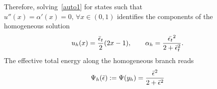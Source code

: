 Therefore, solving~\eqref{auto1} for states such that $u''(x)=\alpha'(x)= 0, \, \forall x\in (0, 1)$ identifies the components of the homogeneous solution
\begin{equation}
u_h(x) =  \frac{\bar \epsilon_t}{2}(2x-1),\qquad\alpha_h = \frac{\Bar{\epsilon_t}^2}{2 + \Bar\epsilon_t^2}\label{eq:homo1}.
\end{equation}
The effective {total} energy along the {homogeneous} branch reads  
\begin{equation}
    \label{eq:energy_homogeneous}
    \Psi_h(\bar\epsilon) :=\Psi(y_h) = \frac{\Bar{\epsilon}^2}{2 + \Bar\epsilon^2}
\end{equation}



